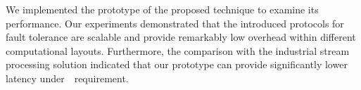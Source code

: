 We implemented the prototype of the proposed technique to examine its performance. Our experiments demonstrated that the introduced protocols for fault tolerance are scalable and provide remarkably low overhead within different computational layouts. Furthermore, the comparison with the industrial stream processing solution indicated that our prototype can provide significantly lower latency under~\eo\ requirement.

